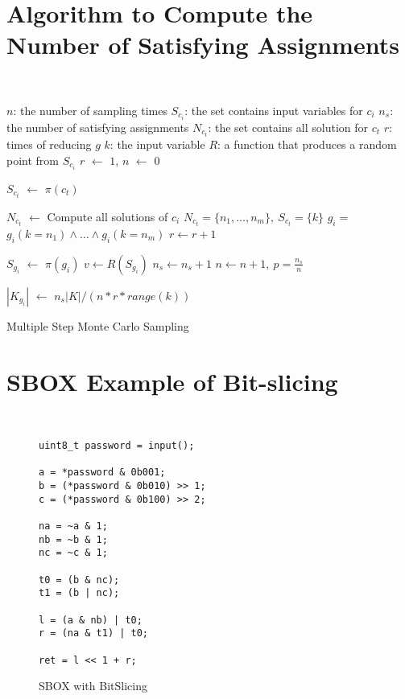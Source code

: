 \section{Algorithm to Compute the Number of Satisfying Assignments}
\label{appendix:montecarlo}
~
{\small
\IncMargin{1em}
\begin{algorithm}
    \SetAlgoLined
    \DontPrintSemicolon


    $n$: the number of sampling times \;
    $S_{c_i}$: the set contains input variables for $c_{i}$ \;
    $n_{s}$: the number of satisfying assignments \;
    $N_{c_t}$: the set contains all solution for $c_t$ \;
    $r$: times of reducing $g$\;
    $k$: the input variable \;
    $R$: a function that produces a random point from $S_{c_i}$\;
    $r$ $\leftarrow$ $1$,
    $n$ $\leftarrow$ $0$ \;
     {
        $S_{c_t}$ $\leftarrow$ $\pi(c_t)$ \;
        {
            $N_{c_t}$ $\leftarrow$ Compute all solutions of $c_i$ \;
            $N_{c_t} = \{n_1, \ldots, n_m\},\ S_{c_t} = \{k\}  $ \;
            $g_{i} = $ $g_i(k=n_1) \land \ldots \land g_i(k=n_m)$ \;
            $r \leftarrow r+1$ \;

        }
    }
     {
        $S_{g_i}$ $\leftarrow$ $\pi(g_i)$ \;
        $v \leftarrow R(S_{g_i})$ 
        {
           $n_s \leftarrow n_s + 1$
        }
        $n \leftarrow n +1,\ p = \frac{n_s}{n}$
    }

    $|K_{g_{i}}|$ $\leftarrow$ $n_s|K| / (n * r * range(k))$
    \caption{Multiple Step Monte Carlo Sampling}
\end{algorithm}
\DecMargin{1em}
}


\section{SBOX Example of Bit-slicing}
\label{appendix:SBOX}
~
\begin{figure}[h!]
    \centering
    \begin{lstlisting}[xleftmargin=.02\textwidth,xrightmargin=.01\textwidth]
uint8_t password = input();

a = *password & 0b001;
b = (*password & 0b010) >> 1;
c = (*password & 0b100) >> 2;

na = ~a & 1;
nb = ~b & 1;
nc = ~c & 1;

t0 = (b & nc);
t1 = (b | nc);

l = (a & nb) | t0;
r = (na & t1) | t0;

ret = l << 1 + r;
      \end{lstlisting}
    \caption{SBOX with BitSlicing}
    \label{fig:SBOX_bitslicing}
\end{figure}

